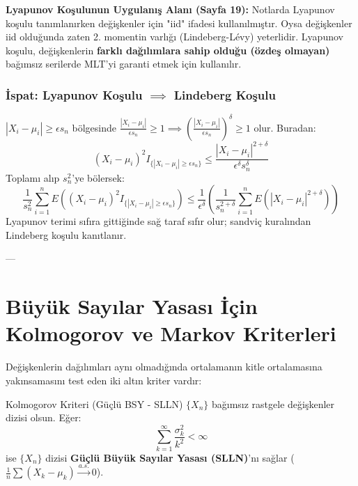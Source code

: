 \documentclass[12pt,a4paper]{article}
\begin{document}
\begin{uyari}
\textbf{Lyapunov Koşulunun Uygulanış Alanı (Sayfa 19):}
Notlarda Lyapunov koşulu tanımlanırken değişkenler için "iid" ifadesi kullanılmıştır. Oysa değişkenler iid olduğunda zaten 2. momentin varlığı (Lindeberg-Lévy) yeterlidir. Lyapunov koşulu, değişkenlerin \textbf{farklı dağılımlara sahip olduğu (özdeş olmayan)} bağımsız serilerde MLT'yi garanti etmek için kullanılır.
\end{uyari}

\subsubsection{İspat: Lyapunov Koşulu \texorpdfstring{$\implies$}{=>} Lindeberg Koşulu}
$|X_i - \mu_i| \ge \epsilon s_n$ bölgesinde $\frac{|X_i - \mu_i|}{\epsilon s_n} \ge 1 \implies \left(\frac{|X_i - \mu_i|}{\epsilon s_n}\right)^\delta \ge 1$ olur. Buradan:
\begin{equation}
    (X_i - \mu_i)^2 I_{\{|X_i - \mu_i| \ge \epsilon s_n\}} \le \frac{|X_i - \mu_i|^{2+\delta}}{\epsilon^\delta s_n^\delta}
\end{equation}
Toplamı alıp $s_n^2$'ye bölersek:
\begin{equation}
    \frac{1}{s_n^2} \sum_{i=1}^n E\left( (X_i - \mu_i)^2 I_{\{|X_i - \mu_i| \ge \epsilon s_n\}} \right) \le \frac{1}{\epsilon^\delta} \left( \frac{1}{s_n^{2+\delta}} \sum_{i=1}^n E\left( |X_i - \mu_i|^{2+\delta} \right) \right)
\end{equation}
Lyapunov terimi sıfıra gittiğinde sağ taraf sıfır olur; sandviç kuralından Lindeberg koşulu kanıtlanır.

---

\section{Büyük Sayılar Yasası İçin Kolmogorov ve Markov Kriterleri}

Değişkenlerin dağılımları aynı olmadığında ortalamanın kitle ortalamasına yakınsamasını test eden iki altın kriter vardır:

\begin{tanim}{Kolmogorov Kriteri (Güçlü BSY - SLLN)}
$\{X_n\}$ bağımsız rastgele değişkenler dizisi olsun. Eğer:
\begin{equation}
    \sum_{k=1}^{\infty} \frac{\sigma_k^2}{k^2} < \infty
\end{equation}
ise $\{X_n\}$ dizisi \textbf{Güçlü Büyük Sayılar Yasası (SLLN)}'nı sağlar ($\frac{1}{n}\sum (X_k - \mu_k) \xrightarrow{a.s.} 0$).
\end{tanim}
\end{document}
